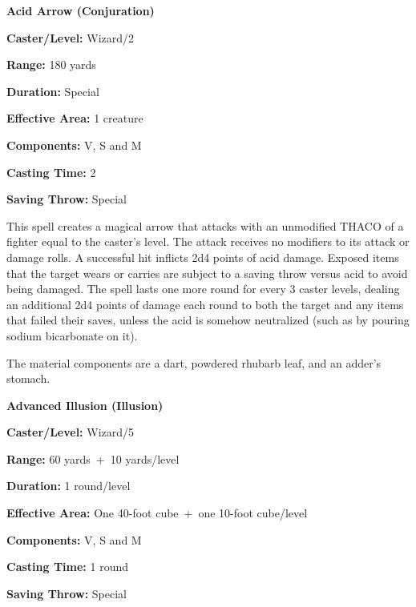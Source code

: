 \begin{multicols}{2}
\noindent
\begin{minipage}{\columnwidth}

\noindent \textbf{Acid Arrow (Conjuration)}	

\noindent \textbf{Caster/Level:} Wizard/2

\noindent \textbf{Range:} 180 yards

\noindent \textbf{Duration:} Special 

\noindent \textbf{Effective Area:} 1 creature

\noindent \textbf{Components:} V, S and M

\noindent \textbf{Casting Time:} 2	

\noindent \textbf{Saving Throw:} Special

\end{minipage}

This spell creates a magical arrow that attacks with an unmodified THACO of a fighter equal to the caster's level.  The attack receives no modifiers to its attack or damage rolls. A successful hit inflicts 2d4 points of acid damage.  Exposed items that the target wears or carries are subject to a saving throw versus acid to avoid being damaged.  The spell lasts one more round for every 3 caster levels, dealing an additional 2d4 points of damage each round to both the target and any items that failed their saves, unless the acid is somehow neutralized (such as by pouring sodium bicarbonate on it).

The material components are a dart, powdered rhubarb leaf, and an adder's stomach.

\vspace{1em}

\noindent
\begin{minipage}{\columnwidth}

\noindent \textbf{Advanced Illusion (Illusion)}

\noindent \textbf{Caster/Level:} Wizard/5

\noindent \textbf{Range:} 60 yards~+~10 yards/level

\noindent \textbf{Duration:} 1 round/level

\noindent \textbf{Effective Area:} One 40-foot cube~+~one 10-foot cube/level

\noindent \textbf{Components:} V, S and M

\noindent \textbf{Casting Time:} 1 round	

\noindent \textbf{Saving Throw:} Special

\end{minipage}


\end{multicols}

